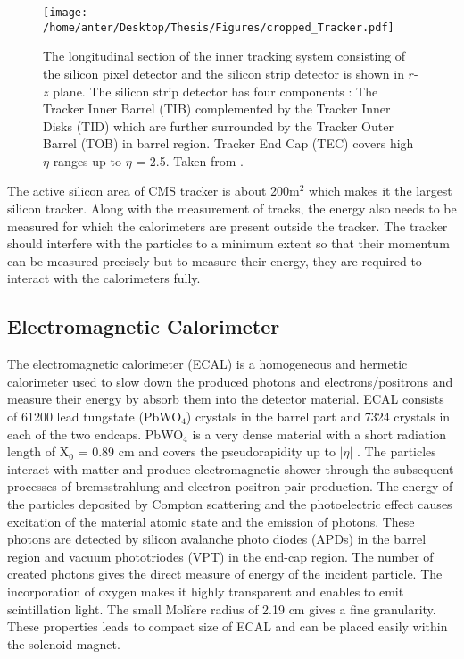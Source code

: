 \begin{figure}[!h]
\begin{center} 
\vspace*{2mm}
\hspace*{-6mm}
\texttt{[image: /home/anter/Desktop/Thesis/Figures/cropped\_Tracker.pdf]}\\
\caption{The longitudinal section of the inner tracking system consisting of the silicon pixel detector and the silicon strip detector is shown in $r$-$z$ plane. The silicon strip detector has four components : The Tracker Inner Barrel (TIB) complemented by the Tracker Inner Disks (TID) which are further surrounded by the Tracker Outer Barrel (TOB) in barrel region. Tracker End Cap (TEC) covers high $\eta$ ranges up to $\eta$ = 2.5. Taken from \cite{Chatrchyan:2008aa}.}
\label{fig:tracker}
\end{center}
\end{figure}
The active silicon area of CMS tracker is about 200m$^{2}$ which makes it the largest silicon tracker. Along with the measurement of tracks, the energy also needs to be measured for which the calorimeters are present outside the tracker. The tracker should interfere with the particles to a minimum extent so that their momentum can be measured precisely but to measure their energy, they are required to interact with the calorimeters fully.

\subsection{Electromagnetic Calorimeter}
The electromagnetic calorimeter (ECAL) is a homogeneous and hermetic calorimeter used to slow down the produced photons and electrons/positrons and measure their energy by absorb them into the detector material. ECAL consists of 61200 lead tungstate (PbWO$_4$) crystals in the barrel part and 7324 crystals in each of the two endcaps. PbWO$_4$ is a very dense material with a short radiation length of X$_0$ = 0.89 cm and covers the pseudorapidity up to $|\eta|$ . The particles interact with matter and produce electromagnetic shower through the subsequent processes of bremsstrahlung and electron-positron pair production. The energy of the particles deposited by Compton scattering and the photoelectric effect causes excitation of the material atomic state and the emission of photons. These photons are detected by silicon avalanche photo diodes (APDs) in the barrel region and vacuum phototriodes (VPT) in the end-cap region. The number of created photons gives the direct measure of energy of the incident particle. The incorporation of oxygen makes it highly transparent and enables to emit scintillation light. The small Moli$\grave{e}$re radius of 2.19 cm gives a fine granularity. These properties leads to compact size of ECAL and can be placed easily within the solenoid magnet. 

